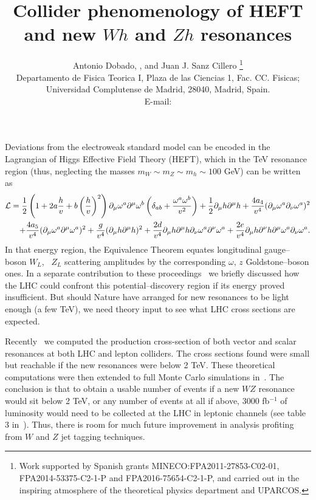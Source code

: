 \documentclass{PoS}
\title{
Collider phenomenology of HEFT\\ and new $Wh$ and $Zh$ resonances
}
\author{Antonio Dobado, \speaker{Felipe J. Llanes-Estrada}, and Juan J. Sanz Cillero \thanks{Work supported by Spanish grants MINECO:FPA2011-27853-C02-01,  FPA2014-53375-C2-1-P and FPA2016-75654-C2-1-P, and carried out in the inspiring atmosphere of the theoretical physics department and UPARCOS.}\\
Departamento de Fisica Teorica I, Plaza de las Ciencias 1, Fac. CC. Fisicas; Universidad Complutense de Madrid, 28040, Madrid, Spain.\\
        E-mail: \email{fllanes@fis.ucm.es}}
\begin{document}
Deviations from the electroweak standard model can be encoded in the Lagrangian of Higgs Effective Field Theory  (HEFT), which in the TeV resonance region (thus, neglecting the masses $m_W\sim m_Z\sim m_h\sim 100$ GeV) can be written as~\cite{Delgado:2015kxa}
\begin{eqnarray} \label{bosonLagrangian}
{\cal L}  =  \frac{1}{2}\left(1 +2 a \frac{h}{v} +b\left(\frac{h}{v}\right)^2\right)
\partial_\mu \omega^a
\partial^\mu \omega^b\left(\delta_{ab}+\frac{\omega^a\omega^b}{v^2}\right)   
\nonumber +\frac{1}{2}\partial_\mu h \partial^\mu h 
  +  \frac{4 a_4}{v^4}(\partial_\mu \omega^a\partial_\nu \omega^a)^2 \nonumber  \\
+\frac{4 a_5}{v^4}( \partial_\mu \omega^a\partial^\mu \omega^a)^2
+\frac{g}{v^4} (\partial_\mu h \partial^\mu h )^2  
  + \frac{2 d}{v^4} \partial_\mu h\partial^\mu h\partial_\nu \omega^a  \partial^\nu\omega^a
+\frac{2 e}{v^4} \partial_\mu h\partial^\nu h\partial^\mu \omega^a \partial_\nu\omega^a.
\end{eqnarray}
In that energy region, the Equivalence Theorem equates longitudinal gauge--boson  $W_L$, \, $Z_L$ scattering amplitudes by the corresponding $\omega, \, z$ Goldstone--boson ones.  In a separate contribution to these proceedings~\cite{Llanes-Estrada:2017ozu} we briefly discussed how the LHC could confront this potential--discovery region if its energy proved insufficient. But should Nature have arranged for new resonances to be light enough (a few TeV), we need theory input to see what LHC cross sections are expected.

Recently~\cite{Dobado:2015hha} we computed the production cross-section of both vector and scalar resonances at both LHC and lepton colliders. The cross sections found were small but reachable if the new resonances were below 2 TeV. These theoretical computations were then extended to full Monte Carlo simulations in~\cite{Delgado:2017cls}.
The conclusion is that to obtain a usable number of events if a new $WZ$ resonance would sit below 2 TeV, or any number of events at all if above, 3000 fb$ ^{-1}$ of luminosity would need to be collected at the LHC in leptonic channels (see table 3 in~\cite{Delgado:2017cls}). 
Thus, there is room for much future improvement in analysis profiting from $W$ and $Z$ jet tagging techniques. 
\end{document}
